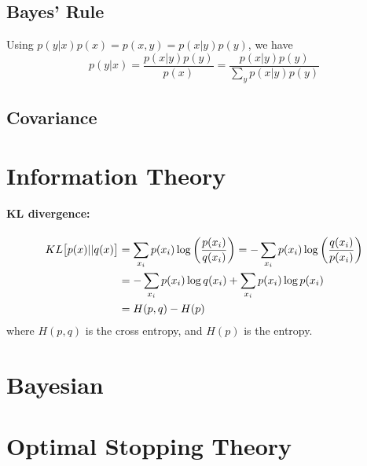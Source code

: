 \documentclass[11pt]{article}
\begin{document}
\subsection{Bayes' Rule}
Using $p(y|x) p(x) = p(x,y) = p(x|y) p(y)$, we have
\begin{equation}
  p(y|x) = \frac{p(x|y) p(y)}{p(x)} = \frac{p(x|y) p(y)}{\sum\limits_y p(x|y) p(y)}
\end{equation}

\subsection{Covariance}


\section{Information Theory}
\paragraph{KL divergence:}
\begin{align}
  KL\big[p(x) || q(x)\big] &= \sum_{x_i} p(x_i) \log\left(\frac{p(x_i)}{q(x_i)} \right)
                             = -\sum_{x_i} p(x_i) \log\left(\frac{q(x_i)}{p(x_i)}
                             \right) \nonumber\\ 
                           &= -\sum_{x_i} p(x_i) \log q(x_i) + \sum_{x_i} p(x_i) \log
                             p(x_i) \nonumber\\ 
                           &= H(p,q) - H(p)
\end{align}
where $H(p,q)$ is the cross entropy, and $H(p)$ is the entropy.


\section{Bayesian}



\section{Optimal Stopping Theory}



\newpage
\printbibliography[heading=bibintoc]

\end{document}
